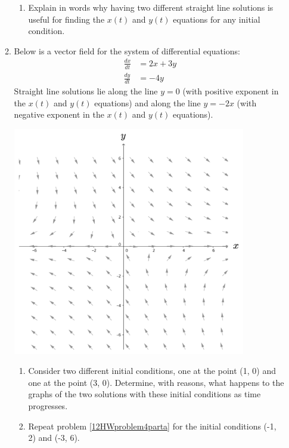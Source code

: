 \begin{enumerate}[resume]
\begin{enumerate}
\begin{enumerate}
\item	Explain in words why having two different straight line solutions is useful for finding the $x(t)$ and $y(t)$ equations for any initial condition. \label{12HWproblem3partc}
\end{enumerate}

\clearpage

\item	Below is a vector field for the system of differential equations:
\begin{align*}
\frac{dx}{dt}&=2x+3y\\
\frac{dy}{dt}&=-4y
\end{align*}
Straight line solutions lie along the line $y = 0$ (with positive exponent in the $x(t)$ and $y(t)$ equations) and along the line $y = -2x$ (with negative exponent in the $x(t)$ and $y(t)$ equations).
\begin{center}
\includegraphics[width=4in]{12/12HWVectorField.png}
\end{center}
\begin{enumerate}
\item	Consider two different initial conditions, one at the point (1, 0) and one at the point (3, 0). Determine, with reasons, what happens to the graphs of the two solutions with these initial conditions as time progresses.\label{12HWproblem4parta} 
\item	Repeat problem \ref{12HWproblem4parta} for the initial conditions (-1, 2) and (-3, 6).\label{12HWproblem4partb}
\vfill

\end{enumerate}


\end{enumerate}
\end{enumerate}
